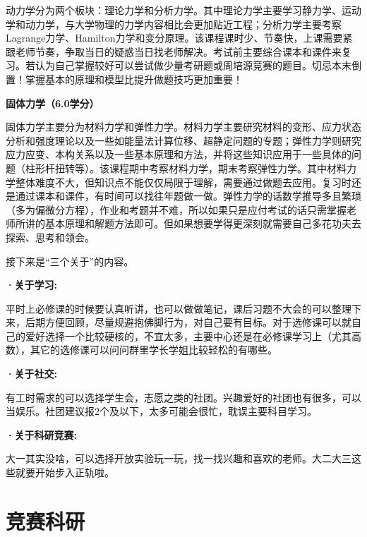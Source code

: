 \documentclass[
decoration,  %
]{qyxf-book}
\begin{document}
动力学分为两个板块：理论力学和分析力学。其中理论力学主要学习静力学、运动学和动力学，与大学物理的力学内容相比会更加贴近工程；分析力学主要考察Lagrange力学、Hamilton力学和变分原理。该课程课时少、节奏快，上课需要紧跟老师节奏，争取当日的疑惑当日找老师解决。考试前主要综合课本和课件来复习。若认为自己掌握较好可以尝试做少量考研题或周培源竞赛的题目。切忌本末倒置！掌握基本的原理和模型比提升做题技巧更加重要！

\textbf{固体力学（6.0学分）}

固体力学主要分为材料力学和弹性力学。材料力学主要研究材料的变形、应力状态分析和强度理论以及一些如能量法计算位移、超静定问题的专题；弹性力学则研究应力应变、本构关系以及一些基本原理和方法，并将这些知识应用于一些具体的问题（柱形杆扭转等）。该课程期中考察材料力学，期末考察弹性力学。其中材料力学整体难度不大，但知识点不能仅仅局限于理解，需要通过做题去应用。复习时还是通过课本和课件，有时间可以找往年题做一做。弹性力学的话数学推导多且繁琐（多为偏微分方程），作业和考题并不难，所以如果只是应付考试的话只需掌握老师所讲的基本原理和解题方法即可。但如果想要学得更深刻就需要自己多花功夫去探索、思考和领会。

\par
接下来是“三个关于”的内容。

\textbf{·关于学习:}


平时上必修课的时候要认真听讲，也可以做做笔记，课后习题不大会的可以整理下来，后期方便回顾，尽量规避抱佛脚行为，对自己要有目标。对于选修课可以就自己的爱好选择一个比较硬核的，不宜太多，主要中心还是在必修课学习上（尤其高数），其它的选修课可以问问群里学长学姐比较轻松的有哪些。


\textbf{·关于社交:}


有工时需求的可以选择学生会，志愿之类的社团。兴趣爱好的社团也有很多，可以当娱乐。社团建议报2个及以下，太多可能会很忙，耽误主要科目学习。


\textbf{·关于科研竞赛:}


大一其实没啥，可以选择开放实验玩一玩，找一找兴趣和喜欢的老师。大二大三这些就要开始步入正轨啦。


\section{竞赛科研}
\end{document}
